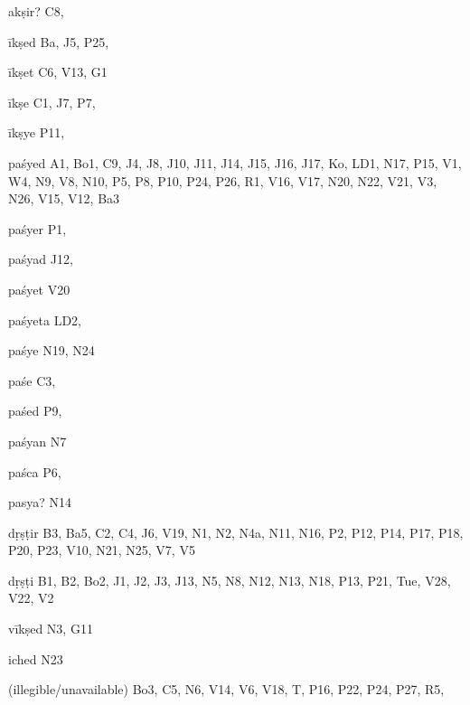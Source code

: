 \begin{ekdosis}
\begin{marma}[hp01_055]
\begin{marma}[hp02_009]
\begin{marma}[hp02_011]
 \begin{marma}[hp02_40c]
\item[akṣir?] C8,
\item[īkṣed] Ba, J5, P25,
\item[īkṣet] C6, V13, G1
\item[īkṣe] C1, J7, P7, 
\item[īkṣye] P11, 
\item[paśyed] A1, Bo1, C9, J4, J8, J10, J11, J14, J15, J16, J17, Ko, LD1, N17, P15, V1, W4, N9, V8, N10, P5, P8, P10, P24, P26, R1, V16, V17, N20, N22, V21, V3, N26, V15, V12, Ba3
\item[paśyer] P1,
\item[paśyad] J12,
\item[paśyet] V20
\item[paśyeta] LD2,
\item[paśye] N19, N24
\item[paśe] C3,
\item[paśed] P9, 
\item[paśyan] N7
\item[paśca] P6, 
\item[pasya?] N14  
\item[dṛṣṭir] B3, Ba5, C2, C4, J6, V19, N1, N2, N4a, N11, N16, P2, P12, P14, P17, P18, P20, P23, V10, N21, N25, V7, V5
\item[dṛṣṭi] B1, B2, Bo2, J1, J2, J3, J13, N5, N8, N12, N13, N18, P13, P21, Tue, V28, V22, V2 
\item[vīkṣed] N3, G11
\item[iched] N23
\item[(illegible/unavailable)] Bo3, C5, N6, V14, V6, V18, T, P16, P22, P24, P27, R5,
  \begin{description}

    \end{description}
 \end{marma}


\end{marma}
\end{marma}
\end{marma}
\end{ekdosis}
